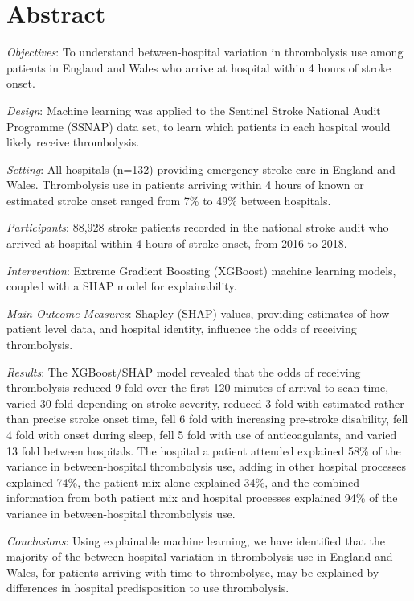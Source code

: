 \section*{Abstract}

\emph{Objectives}: To understand between-hospital variation in thrombolysis use among patients in England and Wales who arrive at hospital within 4 hours of stroke onset.

\emph{Design}: Machine learning was applied to the Sentinel Stroke National Audit Programme (SSNAP)  data set, to learn which patients in each hospital would likely receive thrombolysis.

\emph{Setting}: All hospitals (n=132) providing emergency stroke care in England and Wales. Thrombolysis use in patients arriving within 4 hours of known or estimated stroke onset ranged from 7\% to 49\% between hospitals.

\emph{Participants}: 88,928 stroke patients recorded in the national stroke audit who arrived at hospital within 4 hours of stroke onset, from 2016 to 2018.

\emph{Intervention}: Extreme Gradient Boosting (XGBoost) machine learning models, coupled with a SHAP model for explainability.

\emph{Main Outcome Measures}: Shapley (SHAP) values, providing estimates of how patient level data, and hospital identity, influence the odds of receiving thrombolysis.

\emph{Results}: The XGBoost/SHAP model revealed that the odds of receiving thrombolysis reduced 9 fold over the first 120 minutes of arrival-to-scan time, varied 30 fold depending on stroke severity, reduced 3 fold with estimated rather than precise stroke onset time, fell 6 fold with increasing pre-stroke disability, fell 4 fold with onset during sleep, fell 5 fold with use of anticoagulants, and varied 13 fold between hospitals. The hospital a patient attended explained 58\% of the variance in between-hospital thrombolysis use, adding in other hospital processes explained 74\%, the patient mix alone explained 34\%, and the combined information from both patient mix and hospital processes explained 94\% of the variance in between-hospital thrombolysis use. 



\emph{Conclusions}: Using explainable machine learning, we have identified that the majority of the between-hospital variation in thrombolysis use in England and Wales, for patients arriving with time to thrombolyse, may be explained by differences in hospital predisposition to use thrombolysis.